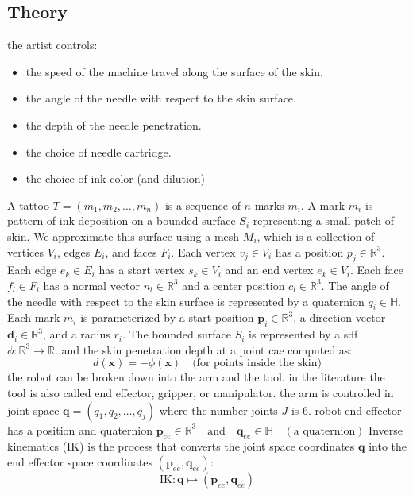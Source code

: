\documentclass[11pt]{article}
\begin{document}
\subsection{Theory}

the artist controls:
\begin{itemize}
    \item the speed of the machine travel along the surface of the skin.
    \item the angle of the needle with respect to the skin surface.
    \item the depth of the needle penetration.
    \item the choice of needle cartridge.
    \item the choice of ink color (and dilution)
\end{itemize}

A tattoo $T = (m_1, m_2, \ldots, m_n)$ is a sequence of $n$ marks $m_i$.
A mark $m_i$ is pattern of ink deposition on a bounded surface $S_i$ representing a small patch of skin.
We approximate this surface using a mesh $M_i$, which is a collection of vertices $V_i$, edges $E_i$, and faces $F_i$.
Each vertex $v_j \in V_i$ has a position $p_j \in \mathbb{R}^3$.
Each edge $e_k \in E_i$ has a start vertex $s_k \in V_i$ and an end vertex $e_k \in V_i$.
Each face $f_l \in F_i$ has a normal vector $n_l \in \mathbb{R}^3$ and a center position $c_l \in \mathbb{R}^3$.
The angle of the needle with respect to the skin surface is represented by a quaternion $q_i \in \mathbb{H}$.
Each mark $m_i$ is parameterized by a start position \( \mathbf{p}_i \in \mathbb{R}^3 \), a direction vector \( \mathbf{d}_i \in \mathbb{R}^3 \), and a radius \( r_i \).
The bounded surface $S_i$ is represented by a sdf $\phi: \mathbb{R}^3 \to \mathbb{R}$.
and the skin penetration depth at a point cae computed as:
\[
d(\mathbf{x}) = -\phi(\mathbf{x}) \quad \text{(for points inside the skin)}
\]
the robot can be broken down into the arm and the tool.
in the literature the tool is also called end effector, gripper, or manipulator.
the arm is controlled in joint space $\mathbf{q} = (q_1, q_2, \ldots, q_j)$ where the number joints $J$ is $6$.
robot end effector has a position and quaternion $\mathbf{p}_{ee} \in \mathbb{R}^3 \quad \text{and} \quad \mathbf{q}_{ee} \in \mathbb{H} \quad (\text{a quaternion})$
Inverse kinematics (IK) is the process that converts the joint space coordinates \( \mathbf{q} \) into the end effector space coordinates \( (\mathbf{p}_{ee}, \mathbf{q}_{ee}) \):
\[
\text{IK}: \mathbf{q} \mapsto (\mathbf{p}_{ee}, \mathbf{q}_{ee})
\]
\end{document}
